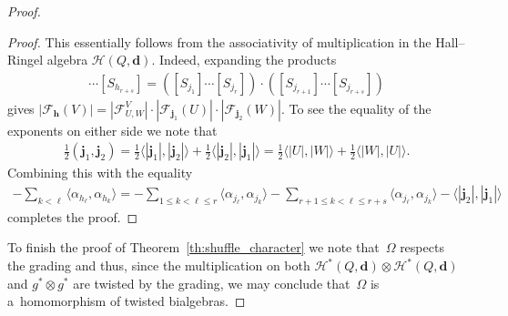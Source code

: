 \begin{proof}
\begin{proof}
This essentially follows from the associativity of multiplication in the Hall--Ringel algebra
$\mathcal{H}(Q,\mathbf{d})$.
Indeed, expanding the products
\begin{gather*}
[S_{h_1}]\cdots[S_{h_{r+s}}]=([S_{j_1}]\cdots[S_{j_r}])\cdot([S_{j_{r+1}}]\cdots[S_{j_{r+s}}])
\end{gather*}
gives
$|\mathcal{F}_\mathbf{h}(V)|=|\mathcal{F}_{U,W}^V|\cdot|\mathcal{F}_{\mathbf{j}_1}(U)|\cdot|\mathcal{F}_{\mathbf{j}_2}(W)|$.
To see the equality of the exponents on either side we note that
\begin{gather*}
\frac{1}{2}(\mathbf{j}_1,\mathbf{j}_2)
=\frac{1}{2}\langle|\mathbf{j}_1|,|\mathbf{j}_2|\rangle+\frac{1}{2}\langle|\mathbf{j}_2|,|\mathbf{j}_1|\rangle
=\frac{1}{2}\langle|U|,|W|\rangle+\frac{1}{2}\langle|W|,|U|\rangle.
\end{gather*}
Combining this with the equality
\begin{gather*}
-\sum\limits_{k<\ell}\langle \alpha_{h_\ell},\alpha_{h_k}\rangle=-\sum\limits_{1\le k<\ell\le r}\langle
\alpha_{j_\ell},\alpha_{j_k}\rangle-\sum\limits_{r+1\le k<\ell\le r+s}\langle
\alpha_{j_\ell},\alpha_{j_k}\rangle-\langle|\mathbf{j}_2|,|\mathbf{j}_1|\rangle
\end{gather*}
completes the proof.
\end{proof}

To f\/inish the proof of Theorem~\ref{th:shuffle_character} we note that~$\Omega$ respects the grading and thus, since the
multiplication on both $\mathcal{H}^*(Q,\mathbf{d})\otimes\mathcal{H}^*(Q,\mathbf{d})$ and $g^*\otimes g^*$ are twisted
by the grading, we may conclude that~$\Omega$ is a~homomorphism of twisted bialgebras.
\end{proof}
